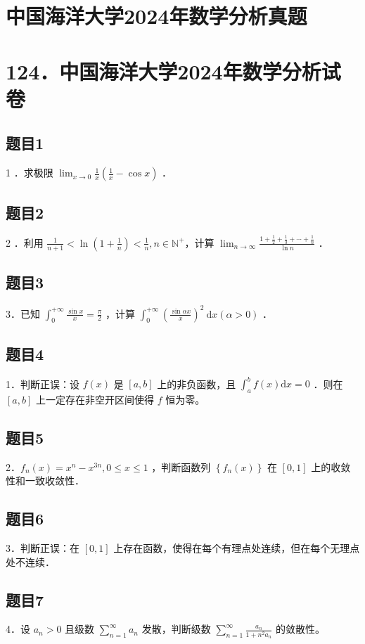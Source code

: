 \documentclass{article}
\begin{document}
\section*{中国海洋大学2024年数学分析真题}
\section*{124．中国海洋大学2024年数学分析试卷}

\subsection{题目1}
1 ．求极限 \(\lim _{x \rightarrow 0} \frac{1}{x}\left(\frac{1}{x}-\cos x\right)\) ．

\subsection{题目2}
2 ．利用 \(\frac{1}{n+1}<\ln \left(1+\frac{1}{n}\right)<\frac{1}{n}, n \in \mathbb{N}^{+}\)，计算 \(\lim _{n \rightarrow \infty} \frac{1+\frac{1}{2}+\frac{1}{3}+\cdots+\frac{1}{n}}{\ln n}\) ．

\subsection{题目3}
3．已知 \(\int_{0}^{+\infty} \frac{\sin x}{x}=\frac{\pi}{2}\) ，计算 \(\int_{0}^{+\infty}\left(\frac{\sin \alpha x}{x}\right)^{2} \mathrm{~d} x(\alpha>0)\) ．

\subsection{题目4}
1．判断正误：设 \(f(x)\) 是 \([a, b]\) 上的非负函数，且 \(\int_{a}^{b} f(x) \mathrm{d} x=0\) ．则在 \([a, b]\) 上一定存在非空开区间使得 \(f\) 恒为零。

\subsection{题目5}
2．\(f_{n}(x)=x^{n}-x^{3 n}, 0 \leq x \leq 1\) ，判断函数列 \(\left\{f_{n}(x)\right\}\) 在 \([0,1]\) 上的收敛性和一致收敛性．

\subsection{题目6}
3．判断正误：在 \([0,1]\) 上存在函数，使得在每个有理点处连续，但在每个无理点处不连续．

\subsection{题目7}
4．设 \(a_{n}>0\) 且级数 \(\sum_{n=1}^{\infty} a_{n}\) 发散，判断级数 \(\sum_{n=1}^{\infty} \frac{a_{n}}{1+n^{2} a_{n}}\) 的敛散性。
\end{document}
